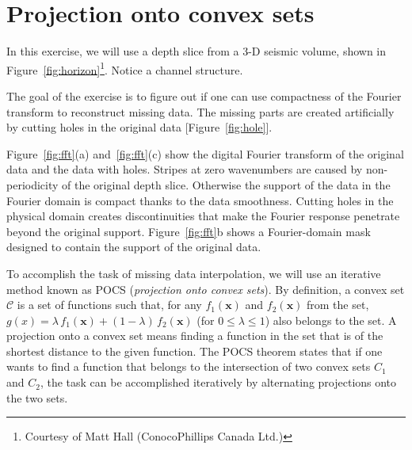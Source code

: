 \section{Projection onto convex sets}

In this exercise, we will use a depth slice from a 3-D seismic
volume, shown in Figure~\ref{fig:horizon}\footnote{Courtesy of Matt
  Hall (ConocoPhillips Canada Ltd.)}. Notice a channel structure. 


The goal of the exercise is to figure out if one can use compactness
of the Fourier transform to reconstruct missing data. The missing
parts are created artificially by cutting holes in the original data
[Figure~\ref{fig:hole}].


Figure~\ref{fig:fft}(a) and~\ref{fig:fft}(c) show the digital Fourier
transform of the original data and the data with holes. Stripes at
zero wavenumbers are caused by non-periodicity of the original depth
slice. Otherwise the support of the data in the Fourier domain is
compact thanks to the data smoothness. Cutting holes in the physical
domain creates discontinuities that make the Fourier response
penetrate beyond the original support. Figure~\ref{fig:fft}b shows a
Fourier-domain mask designed to contain the support of the original
data.

To accomplish the task of missing data interpolation, we will use an
iterative method known as POCS (\emph{projection onto convex
sets}). By definition, a convex set $\mathcal{C}$ is a set of
functions such that, for any $f_1(\mathbf{x})$ and $f_2(\mathbf{x})$
from the set, $g(x) = \lambda\,f_1(\mathbf{x}) +
(1-\lambda)\,f_2(\mathbf{x})$ (for $0 \le \lambda \le 1$) also belongs
to the set. A projection onto a convex set means finding a function in
the set that is of the shortest distance to the given function. The
POCS theorem states that if one wants to find a function that belongs
to the intersection of two convex sets $C_1$ and $C_2$, the task can
be accomplished iteratively by alternating projections onto the two
sets.

